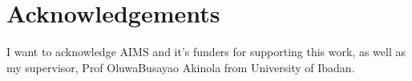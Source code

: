 \chapter*{Acknowledgements}

I want to acknowledge AIMS and it's funders for supporting this work, as well as my supervisor, Prof OluwaBusayao Akinola from University of Ibadan.

